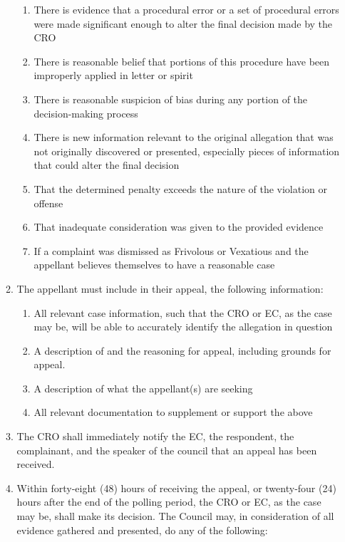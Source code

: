 \begin{enumerate}
\begin{enumerate}
				\begin{enumerate}
					\item There is evidence that a procedural error or a set of procedural errors were made significant enough to alter the final decision made by the CRO
					\item There is reasonable belief that portions of this procedure have been improperly applied in letter or spirit
					\item There is reasonable suspicion of bias during any portion of the decision-making process
					\item There is new information relevant to the original allegation that was not originally discovered or presented, especially pieces of information that could alter the final decision
					\item That the determined penalty exceeds the nature of the violation or offense
					\item That inadequate consideration was given to the provided evidence
					\item If a complaint was dismissed as Frivolous or Vexatious and the appellant believes themselves to have a reasonable case
				\end{enumerate}
			\item The appellant must include in their appeal, the following information:
				\begin{enumerate}
					\item All relevant case information, such that the CRO or EC, as the case may be, will be able to accurately identify the allegation in question
					\item A description of and the reasoning for appeal, including grounds for appeal.
					\item A description of what the appellant(s) are seeking
					\item All relevant documentation to supplement or support the above
				\end{enumerate}
			\item The CRO shall immediately notify the EC, the respondent, the complainant, and the speaker of the council  that an appeal has been received.
			\item Within forty-eight (48) hours of receiving the appeal, or twenty-four (24) hours after the end of the polling period, the CRO or EC, as the case may be, shall make its decision. The Council may, in consideration of all evidence gathered and presented, do any of the following:
				\begin{enumerate}

\end{enumerate}
\end{enumerate}
\end{enumerate}
